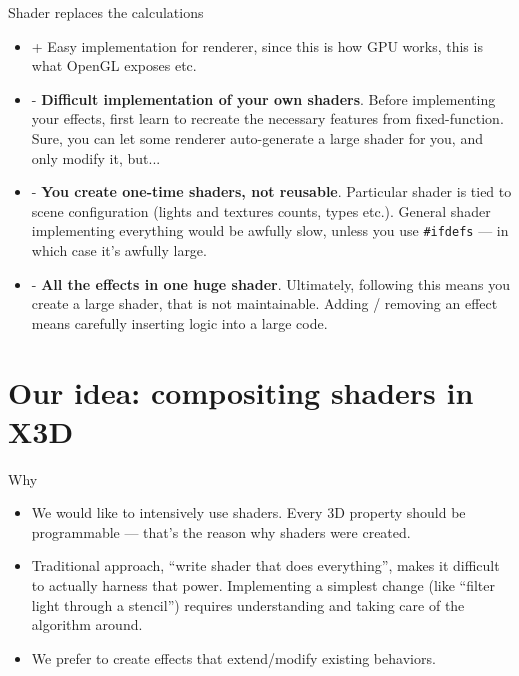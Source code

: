 \documentclass{beamer}
\begin{document}
\begin{frame}{Shader replaces the calculations}

\begin{itemize}
  \item + Easy implementation for renderer, since this is how GPU works,
    this is what OpenGL exposes etc.
  \item - \textbf{Difficult implementation of your own shaders}.
    Before implementing your effects, first learn to recreate
    the necessary features from fixed-function.
    Sure, you can let some renderer auto-generate a large shader for you,
    and only modify it, but...
  \item - \textbf{You create one-time shaders, not reusable}.
    Particular shader is tied to scene configuration (lights and textures
    counts, types etc.). General shader implementing everything
    would be awfully slow, unless you use \texttt{\#ifdefs} --- in which case
    it's awfully large.
  \item - \textbf{All the effects in one huge shader}.
    Ultimately, following this means you create a large shader,
    that is not maintainable. Adding / removing an effect means carefully
    inserting logic into a large code.
\end{itemize}
\end{frame}

\section[Our idea]{Our idea: compositing shaders in X3D}

\begin{frame}{Why}
\begin{itemize}
  \item We would like to intensively use shaders. Every 3D property
    should be programmable --- that's the reason why shaders were created.

  \item Traditional approach, ``write shader that does everything'',
    makes it difficult to actually harness that power.
    Implementing a simplest change (like ``filter light through a stencil'')
    requires understanding and taking care of the algorithm around.

  \item We prefer to create effects that extend/modify existing behaviors.
\end{itemize}
\end{frame}
\end{document}
